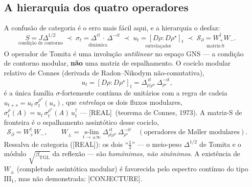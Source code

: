 \documentclass[11pt,a4paper]{article}
\newcommand{\REAL}{\textsf{[REAL]}}
\newcommand{\CONJ}{\textsf{[CONJECTURE]}}
\newcommand{\bTGL}{\beta_{\mathrm{TGL}}}
\begin{document}
\subsection{A hierarquia dos quatro operadores}
A confusão de categoria é o erro mais fácil aqui, e a hierarquia o desfaz:
\begin{equation}
\underset{\text{condição de contorno}}{S=J\Delta^{1/2}}
\;\prec\;
\underset{\text{dinâmica}}{\sigma_t=\Delta^{it}\,\cdot\,\Delta^{-it}}
\;\prec\;
\underset{\text{entrelaçador}}{u_t=[D\rho:D\rho^\star]_t}
\;\prec\;
\underset{\text{matriz-S}}{\mathcal S_\partial=W_+^\dagger W_-}.
\end{equation}
O operador de Tomita é uma involução \emph{antilinear} no espaço GNS --- a
condição de contorno modular, \textbf{não} uma matriz de espalhamento. O
cociclo modular relativo de Connes (derivada de Radon--Nikodym
não-comutativa),
\begin{equation}
u_t=[D\rho:D\rho^\star]_t
=\Delta_{\rho|\rho^\star}^{\,it}\,\Delta_{\rho^\star}^{-it},
\end{equation}
é a única família $\sigma$-fortemente contínua de unitários com a regra de
cadeia $u_{t+s}=u_t\,\sigma_t^{\rho^\star}(u_s)$, que \emph{entrelaça} os
dois fluxos modulares, $\sigma_t^{\rho}(A)=u_t\,\sigma_t^{\rho^\star}(A)\,
u_t^\dagger$ --- \REAL\ (teorema de Connes, 1973). A matriz-S de fronteira é
o espalhamento assintótico desse cociclo,
\begin{equation}
\mathcal S_\partial=W_+^\dagger W_-,\qquad
W_\pm=\operatorname*{s\text{-}lim}_{t\to\pm\infty}
\Delta_{\rho|\rho^\star}^{\,it}\,\Delta_{\rho^\star}^{-it}
\quad(\text{operadores de Møller modulares}).
\end{equation}
Ressalva de categoria (\REAL): os dois ``$\tfrac12$'' --- o meio-peso
$\Delta^{1/2}$ de Tomita e o módulo $\sqrt{\bTGL}$ da reflexão --- são
\emph{homônimos, não sinônimos}. A existência de $W_\pm$ (completude
assintótica modular) é favorecida pelo espectro contínuo do tipo
$\mathrm{III}_1$, mas não demonstrada: \CONJ.
\end{document}
